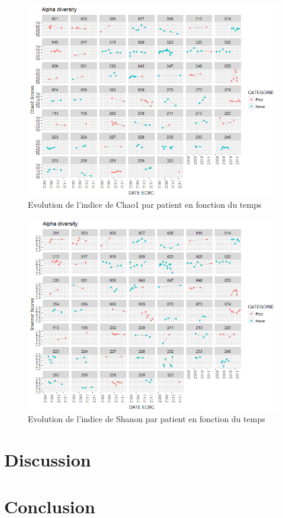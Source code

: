 \documentclass[12pt,a4paper]{article}
\begin{document}
\begin{figure}
\begin{center}
\includegraphics[scale=0.80]{img/alpha_chao1.png}\hfill
\end{center}
\caption{Evolution de l'indice de Chao1 par patient en fonction du temps}
\label{alphaChao1}
\end{figure}

\begin{figure}
\begin{center}
\includegraphics[scale=0.80]{img/alpha_shannon.png}\hfill
\end{center}
\caption{Evolution de l'indice de Shanon par patient en fonction du temps}
\label{alphaShannon}
\end{figure}







\section{Discussion}


\section{Conclusion}




\newpage




\end{document}
